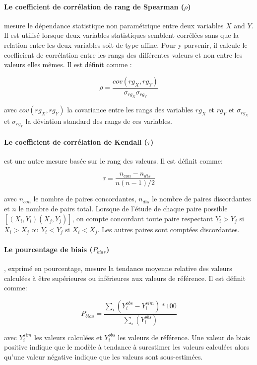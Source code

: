 \paragraph{Le coefficient de corrélation de rang de Spearman ($\rho$)}  mesure le dépendance statistique non paramétrique entre deux variables $X$ and $Y$. Il est utilisé lorsque deux variables statistiques semblent corrélées sans que la relation entre les deux variables soit de type affine. Pour y parvenir, il calcule le coefficient de corrélation entre les rangs des différentes valeurs et non entre les valeurs elles mêmes. Il est définit comme :

\begin{equation}
    \rho = \frac{cov(rg_X,rg_Y)}{\sigma_{rg_X} \sigma_{rg_Y}}
\end{equation}

\noindent avec $cov(rg_X,rg_Y)$ la covariance entre les rangs des variables $rg_X$ et $rg_Y$ et $\sigma_{rg_X}$ et $\sigma_{rg_Y}$ la déviation standard des rangs de ces variables. 

\paragraph{Le coefficient de corrélation de Kendall ($\tau$)}  est une autre mesure basée sur le rang des valeurs. Il est définit comme:

\begin{equation}
    \tau = \frac{n_{con}-n_{dis}}{n(n-1)/2}
\end{equation}

\noindent avec $n_{con}$ le nombre de paires concordantes, $n_{dis}$ le nombre de paires discordantes et $n$ le nombre de pairs total. Lorsque de l'étude de chaque paire possible $[(X_i,Y_i)(X_j,Y_j)]$, on compte concordant toute paire respectant $Y_i>Y_j$ si $X_i>X_j$ ou $Y_i<Y_j$ si $X_i<X_j$. Les autres paires sont comptées discordantes.


\paragraph{Le pourcentage de biais ($P_{bias}$)}, exprimé en pourcentage, mesure la tendance moyenne relative des valeurs calculées à être supérieures ou inférieures aux valeurs de référence. Il est définit comme:

\begin{equation}
    P_{bias} = \frac{\sum_i(Y_{i}^{obs}-Y_{i}^{sim})*100}{\sum_i(Y_{i}^{obs})}
\end{equation}

\noindent avec $Y_{i}^{sim}$ les valeurs calculées et $Y_{i}^{obs}$ les valeurs de référence. Une valeur de biais positive indique que le modèle à tendance à surestimer les valeurs calculées alors qu'une valeur négative indique que les valeurs sont sous-estimées.
